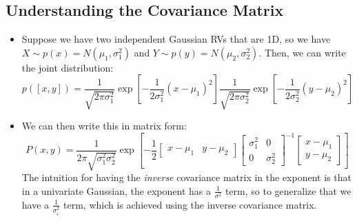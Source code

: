 \subsection{Understanding the Covariance Matrix}


\begin{itemize}
	\item Suppose we have two independent Gaussian RVs that are 1D, so we have \( X
		\sim p(x) = N(\mu_1, \sigma_1^2)  \) and \( Y \sim p(y) = N(\mu_2,
		\sigma_2^2) \). Then, we can write the joint distribution:
		\[
			p([x, y]) = \frac{1}{\sqrt{2\pi \sigma_1^2}}\exp\left[
			-\frac{1}{2\sigma_1^2}(x - \mu_1)^2 \right]
			\frac{1}{\sqrt{2\pi \sigma_2^2}}
			\exp\left[ -\frac{1}{2\sigma_2^2}(y - \mu_2)^2 \right]
		\]
	\item We can then write this in matrix form:
		\[
			P(x, y) = \frac{1}{2\pi \sqrt{\sigma_1^2 \sigma_2^2}} 
			\exp\left[-\frac{1}{2} 
				\begin{bmatrix} 
					x - \mu_1 & y - \mu_2
				\end{bmatrix} 
				\begin{bmatrix} 
					\sigma_1^2 & 0 \\ 0 & \sigma_2^2 
				\end{bmatrix}^{-1} 
				\begin{bmatrix} 
					x - \mu_1 \\ y - \mu_2 
			\end{bmatrix} \right]
		\] 
		The intuition for having the \textit{inverse} covariance matrix in the
		exponent is that in a univariate Gaussian, the exponent has a 
		\( \frac{1}{\sigma^2} \) term, so to generalize that we have a 
		\( \frac{1}{\sigma_i^2} \) term, which is achieved using the 
		inverse covariance matrix. 

\end{itemize}

